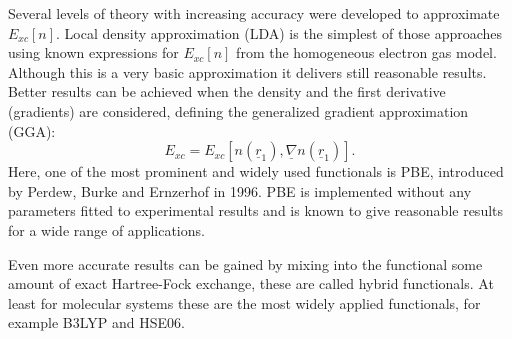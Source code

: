 \documentclass[11pt,DIV=13,BCOR=5mm,a4paper,headinclude]{scrbook}
\renewcommand{\vec}[1]{\underline{#1}}
\begin{document}
Several levels of theory with increasing accuracy were developed to approximate $E_{xc}[n]$.
Local density approximation (LDA) is the simplest of those approaches using known expressions for $E_{xc}[n]$ from the homogeneous electron gas model.
Although this is a very basic approximation it delivers still reasonable results.
Better results can be achieved when the density and the first derivative (gradients) are considered, defining the generalized gradient approximation (GGA):
\begin{equation}
  E_{xc}=E_{xc}[n(\vec{r}_1),\vec{\nabla} n(\vec{r}_1)].
\end{equation}
Here, one of the most prominent and widely used functionals is PBE, introduced by Perdew, Burke and Ernzerhof in 1996\cite{Perdew96a,erratum}.
PBE is implemented without any parameters fitted to experimental results and is known to give reasonable results for a wide range of applications.


Even more accurate results can be gained by mixing into the functional some amount of exact Hartree-Fock exchange, these are called hybrid functionals.
At least for molecular systems these are the most widely applied functionals, for example B3LYP\cite{B3LYP1,B3LYP2} and HSE06\cite{HSE06}.
\end{document}
